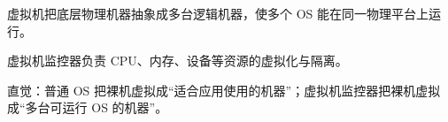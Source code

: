 \begin{points}
  \item 虚拟机把底层物理机器抽象成多台逻辑机器，使多个 OS 能在同一物理平台上运行。
  \item 虚拟机监控器负责 CPU、内存、设备等资源的虚拟化与隔离。
  \item 直觉：普通 OS 把裸机虚拟成“适合应用使用的机器”；虚拟机监控器把裸机虚拟成“多台可运行 OS 的机器”。
\end{points}
